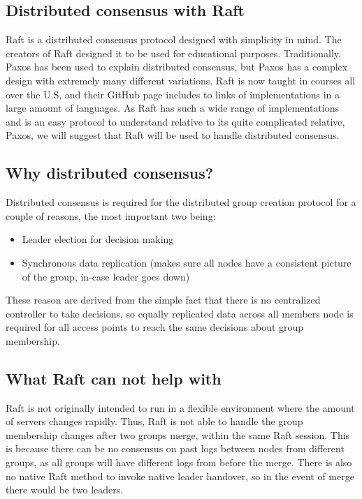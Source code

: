 \subsection{Distributed consensus with Raft}
Raft \cite{raftio} is a distributed consensus protocol designed with simplicity in mind. The creators of Raft designed it to be used for educational purposes. Traditionally, Paxos has been used to explain distributed consensus, but Paxos has a complex design with extremely many different variations. Raft is now taught in courses all over the U.S, and their GitHub page includes to links
of implementations in a large amount of languages. As Raft has such a wide range of implementations and is an easy protocol to understand relative to its quite complicated relative, Paxos, 
we will suggest that Raft will be used to handle distributed consensus. 

\subsection{Why distributed consensus?}
Distributed consensus is required for the distributed group creation protocol for a couple of reasons, the most important two being:
\begin{itemize}
	\item Leader election for decision making
	\item	Synchronous data replication (makes sure all nodes have a consistent picture of the group, in-case leader goes down)
\end{itemize}

These reason are derived from the simple fact that there is no centralized controller to take decisions, so equally replicated data across all members node is required for all access
points to reach the same decisions about group membership. 

\subsection{What Raft can not help with}
Raft is not originally intended to run in a flexible environment where the amount of servers changes rapidly. Thus, Raft is not able to handle the group membership changes
after two groups merge, within the same Raft session. This is because there can be no consensus on past logs between nodes from different groups, as all groups will have different logs from before the merge. There is also no native Raft method to invoke native leader handover, so in the event of merge there would be two leaders. 

